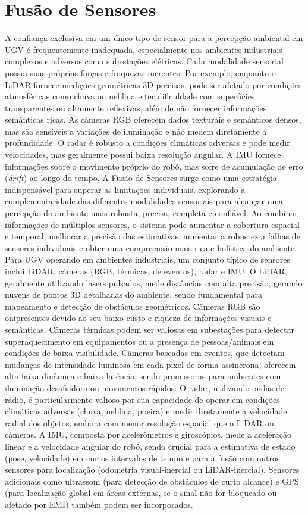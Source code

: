 \section{Fusão de Sensores}
A confiança exclusiva em um único tipo de sensor para a percepção ambiental em \ac{UGV} é frequentemente inadequada, especialmente nos ambientes industriais complexos e adversos como subestações elétricas. Cada modalidade sensorial possui suas próprias forças e fraquezas inerentes. Por exemplo, enquanto o \ac{LiDAR} fornece medições geométricas 3D precisas, pode ser afetado por condições atmosféricas como chuva ou neblina e ter dificuldade com superfícies transparentes ou altamente reflexivas, além de não fornecer informações semânticas ricas. As câmeras RGB oferecem dados texturais e semânticos densos, mas são sensíveis a variações de iluminação e não medem diretamente a profundidade. O radar é robusto a condições climáticas adversas e pode medir velocidades, mas geralmente possui baixa resolução angular. A \ac{IMU} fornece informações sobre o movimento próprio do robô, mas sofre de acumulação de erro (\textit{drift}) ao longo do tempo. A Fusão de Sensores surge como uma estratégia indispensável para superar as limitações individuais, explorando a complementaridade das diferentes modalidades sensoriais para alcançar uma percepção do ambiente mais robusta, precisa, completa e confiável. Ao combinar informações de múltiplos sensores, o sistema pode aumentar a cobertura espacial e temporal, melhorar a precisão das estimativas, aumentar a robustez a falhas de sensores individuais e obter uma compreensão mais rica e holística do ambiente.
Para \ac{UGV} operando em ambientes industriais, um conjunto típico de sensores inclui \ac{LiDAR}, câmeras (RGB, térmicas, de eventos), radar e \ac{IMU}. O \ac{LiDAR}, geralmente utilizando lasers pulsados, mede distâncias com alta precisão, gerando nuvens de pontos 3D detalhadas do ambiente, sendo fundamental para mapeamento e detecção de obstáculos geométricos. Câmeras RGB são onipresentes devido ao seu baixo custo e riqueza de informações visuais e semânticas. Câmeras térmicas podem ser valiosas em subestações para detectar superaquecimento em equipamentos ou a presença de pessoas/animais em condições de baixa visibilidade. Câmeras baseadas em eventos, que detectam mudanças de intensidade luminosa em cada pixel de forma assíncrona, oferecem alta faixa dinâmica e baixa latência, sendo promissoras para ambientes com iluminação desafiadora ou movimentos rápidos. O radar, utilizando ondas de rádio, é particularmente valioso por sua capacidade de operar em condições climáticas adversas (chuva, neblina, poeira) e medir diretamente a velocidade radial dos objetos, embora com menor resolução espacial que o \ac{LiDAR} ou câmeras. A \ac{IMU}, composta por acelerômetros e giroscópios, mede a aceleração linear e a velocidade angular do robô, sendo crucial para a estimativa de estado (pose, velocidade) em curtos intervalos de tempo e para a fusão com outros sensores para localização (odometria visual-inercial ou LiDAR-inercial). Sensores adicionais como ultrassom (para detecção de obstáculos de curto alcance) e GPS (para localização global em áreas externas, se o sinal não for bloqueado ou afetado por \ac{EMI}) também podem ser incorporados.
